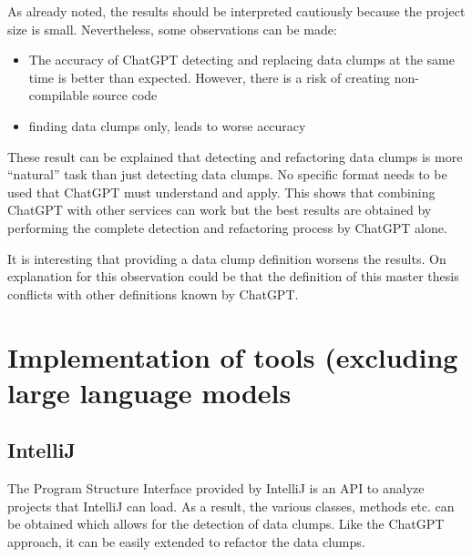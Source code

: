 As already noted, the results should be interpreted cautiously because the project size is small. Nevertheless, some observations can be made:

\begin{itemize}
\begin{comment}
    \item Use examples for data clump as the instruction format as they seem to produce better results
    \item Use a high temperature which allows for more creativity and apparent better results
    \item If possible (given the higher costs) use GPT-4
    \item Whether all files or pair of files should be transferred is difficult to say and the impact is difficult to determine. 
    \end{comment}
    \item The accuracy of ChatGPT detecting and replacing data clumps at the same time is better than expected. However, there is a risk of creating non-compilable source code
    \item finding data clumps only, leads to worse accuracy
\end{itemize}
These result can be explained that detecting and refactoring data clumps is more \enquote{natural} task than just detecting data clumps. No specific format needs to be used that ChatGPT must understand and apply. This shows that combining ChatGPT with other services can work but the best results are obtained by performing the complete detection and refactoring process by ChatGPT alone. 

It is interesting that providing a data clump definition worsens the results. On explanation for this observation could be that the definition of this master thesis conflicts with other definitions known by ChatGPT.

\section{Implementation of tools (excluding large language models} \label{sec:step_impl}


\subsection{IntelliJ}
The Program Structure Interface provided by IntelliJ is an \ac{API} to analyze projects that IntelliJ can load. As a result, the various classes, methods etc. can be obtained which allows for the detection of data clumps. Like the ChatGPT approach, it can be easily extended to refactor the data clumps.


